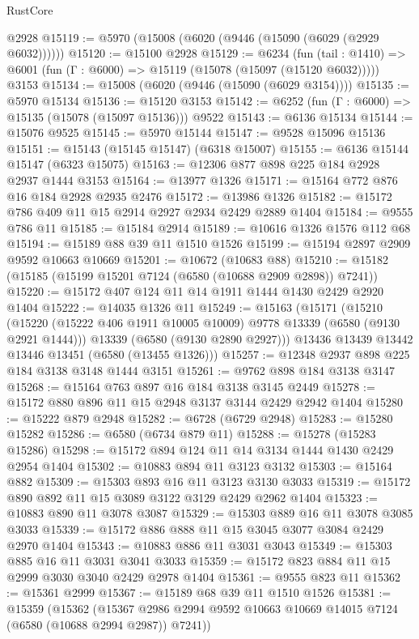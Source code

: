 \begin{lexlean}{RustCore}
\begin{coremodule}
    @2928
@15119 := @5970 (@15008 (@6020 (@9446 (@15090 (@6029 (@2929 @6032))))))
@15120 := @15100 @2928
@15129 := @6234
    (fun (tail : @1410) => @6001 (fun (Γ : @6000) => @15119 (@15078 (@15097 (@15120 @6032)))))
    @3153
@15134 := @15008 (@6020 (@9446 (@15090 (@6029 @3154))))
@15135 := @5970 @15134
@15136 := @15120 @3153
@15142 := @6252 (fun (Γ : @6000) => @15135 (@15078 (@15097 @15136))) @9522
@15143 := @6136 @15134
@15144 := @15076 @9525
@15145 := @5970 @15144
@15147 := @9528 @15096 @15136
@15151 := @15143 (@15145 @15147) (@6318 @15007)
@15155 := @6136 @15144 @15147 (@6323 @15075)
@15163 := @12306 @877 @898 @225 @184 @2928 @2937 @1444 @3153
@15164 := @13977 @1326
@15171 := @15164 @772 @876 @16 @184 @2928 @2935 @2476
@15172 := @13986 @1326
@15182 := @15172 @786 @409 @11 @15 @2914 @2927 @2934 @2429 @2889 @1404
@15184 := @9555 @786 @11
@15185 := @15184 @2914
@15189 := @10616 @1326 @1576 @112 @68
@15194 := @15189 @88 @39 @11 @1510 @1526
@15199 := @15194 @2897 @2909 @9592 @10663 @10669
@15201 := @10672 (@10683 @88)
@15210 := @15182 (@15185 (@15199 @15201 @7124 (@6580 (@10688 @2909 @2898)) @7241))
@15220 := @15172 @407 @124 @11 @14 @1911 @1444 @1430 @2429 @2920 @1404
@15222 := @14035 @1326 @11
@15249 := @15163
    (@15171
      (@15210
        (@15220 (@15222 @406 @1911 @10005 @10009) @9778 @13339 (@6580 (@9130 @2921 @1444)))
        @13339
        (@6580 (@9130 @2890 @2927)))
      @13436
      @13439
      @13442
      @13446
      @13451
      (@6580 (@13455 @1326)))
@15257 := @12348 @2937 @898 @225 @184 @3138 @3148 @1444 @3151
@15261 := @9762 @898 @184 @3138 @3147
@15268 := @15164 @763 @897 @16 @184 @3138 @3145 @2449
@15278 := @15172 @880 @896 @11 @15 @2948 @3137 @3144 @2429 @2942 @1404
@15280 := @15222 @879 @2948
@15282 := @6728 (@6729 @2948)
@15283 := @15280 @15282
@15286 := @6580 (@6734 @879 @11)
@15288 := @15278 (@15283 @15286)
@15298 := @15172 @894 @124 @11 @14 @3134 @1444 @1430 @2429 @2954 @1404
@15302 := @10883 @894 @11 @3123 @3132
@15303 := @15164 @882
@15309 := @15303 @893 @16 @11 @3123 @3130 @3033
@15319 := @15172 @890 @892 @11 @15 @3089 @3122 @3129 @2429 @2962 @1404
@15323 := @10883 @890 @11 @3078 @3087
@15329 := @15303 @889 @16 @11 @3078 @3085 @3033
@15339 := @15172 @886 @888 @11 @15 @3045 @3077 @3084 @2429 @2970 @1404
@15343 := @10883 @886 @11 @3031 @3043
@15349 := @15303 @885 @16 @11 @3031 @3041 @3033
@15359 := @15172 @823 @884 @11 @15 @2999 @3030 @3040 @2429 @2978 @1404
@15361 := @9555 @823 @11
@15362 := @15361 @2999
@15367 := @15189 @68 @39 @11 @1510 @1526
@15381 := @15359
    (@15362
      (@15367 @2986 @2994 @9592 @10663 @10669 @14015 @7124 (@6580 (@10688 @2994 @2987)) @7241))

\end{coremodule}
\end{lexlean}
